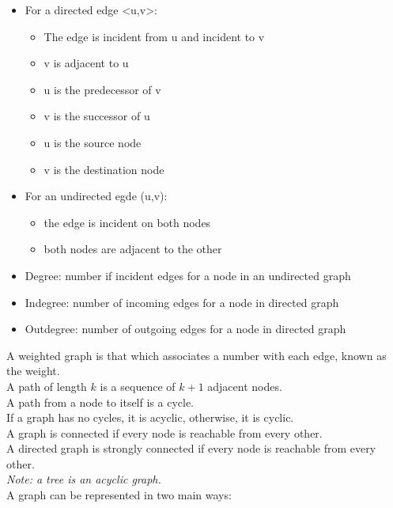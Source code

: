 \documentclass[nobib]{tufte-handout}
\begin{document}
\begin{itemize}
    \item For a directed edge <u,v>:\\
    \begin{itemize}
        \item The edge is incident from u and incident to v
        \item v is adjacent to u
        \item u is the predecessor of v
        \item v is the successor of u
        \item u is the source node
        \item v is the destination node
    \end{itemize}
    \item For an undirected egde (u,v):
    \begin{itemize}
        \item the edge is incident on both nodes
        \item both nodes are adjacent to the other
    \end{itemize}
    \item Degree: number if incident edges for a node in an undirected graph
    \item Indegree: number of incoming edges for a node in directed graph
    \item Outdegree: number of outgoing edges for a node in directed graph
\end{itemize}
A weighted graph is that which associates a number with each edge, known as the weight.\\
A path of length $k$ is a sequence of $k+1$ adjacent nodes.\\
A path from a node to itself is a cycle.\\
If a graph has no cycles, it is acyclic, otherwise, it is cyclic.\\
A graph is connected if every node is reachable from every other.\\
A directed graph is strongly connected if every node is reachable from every other.\\
\textit{Note: a tree is an acyclic graph.}\\
A graph can be represented in two main ways:
\end{document}
